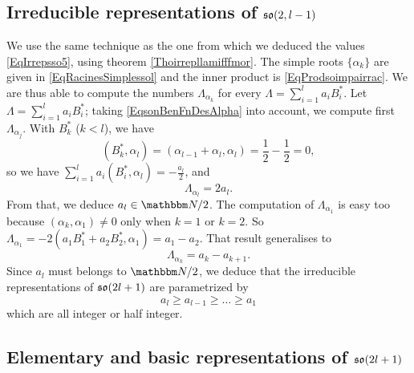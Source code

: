 					\subsection{Irreducible representations of \texorpdfstring{$\operatorname{\mathfrak{so}}(2,l-1)$}{so2l}}

We use the same technique as the one from which we deduced the values \eqref{EqIrrepsso5}, using theorem \ref{Thoirrepllamifffmor}. The simple roots $\{ \alpha_k \}$ are given in \eqref{EqRacinesSimplessol} and the inner product is \eqref{EqProdsoimpairrac}. We are thus able to compute the numbers $\Lambda_{\alpha_k}$ for every $\Lambda=\sum_{i=1}^la_iB^*_i$. Let $\Lambda=\sum_{i=1}^la_iB^*_i$; taking \eqref{EqsonBenFnDesAlpha} into account, we compute first $\Lambda_{\alpha_j}$. With $B_k^*$ ($k<l$), we have
\begin{equation}
	(B^*_k,\alpha_l)=(\alpha_{l-1}+\alpha_l,\alpha_l)=\frac{ 1 }{2}-\frac{ 1 }{2}=0,
\end{equation}
so we have $\sum_{i=1}^la_i(B^*_i,\alpha_l)=-\frac{ a_l }{ 2 }$, and
\begin{equation}
	\Lambda_{\alpha_l}=2a_l.
\end{equation}
From that, we deduce $a_l\in\eN/2$. The computation of $\Lambda_{\alpha_1}$ is easy too because $(\alpha_k,\alpha_1)\neq 0$ only when $k=1$ or $k=2$. So $\Lambda_{\alpha_1}=-2(a_1B^*_1+a_2B^*_2,\alpha_1)=a_1-a_2$. That result generalises to
\begin{equation}
	\Lambda_{\alpha_k}=a_k-a_{k+1}.
\end{equation}
Since $a_l$ must belongs to $\eN/2$, we deduce that the irreducible representations of $\operatorname{\mathfrak{so}}(2l+1)$ are parametrized by
\begin{equation}
	a_l\geq a_{l-1}\geq\ldots\geq a_1
\end{equation}
which are all integer or half integer.

\subsection{Elementary and basic representations of \texorpdfstring{$\operatorname{\mathfrak{so}}(2l+1)$}{so2l+1}}

